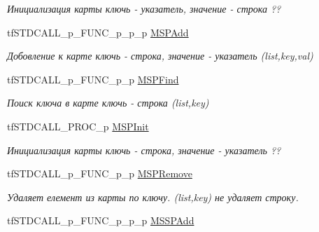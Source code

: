 \begin{DoxyCompactItemize}
\begin{DoxyCompactList}\small\item\em Инициализация карты ключь -\/ указатель, значение -\/ строка ?? \end{DoxyCompactList}\item 
\hypertarget{structs_functions_array_c_p_u_a66be444d39d6671d135d027d992580e2}{tf\-S\-T\-D\-C\-A\-L\-L\-\_\-p\-\_\-\-F\-U\-N\-C\-\_\-p\-\_\-p\-\_\-p \hyperlink{structs_functions_array_c_p_u_a66be444d39d6671d135d027d992580e2}{M\-S\-P\-Add}}\label{structs_functions_array_c_p_u_a66be444d39d6671d135d027d992580e2}

\begin{DoxyCompactList}\small\item\em Добовление к карте ключь -\/ строка, значение -\/ указатель (list,key,val) \end{DoxyCompactList}\item 
\hypertarget{structs_functions_array_c_p_u_adfe368438b4aeb33922bc8b84117992d}{tf\-S\-T\-D\-C\-A\-L\-L\-\_\-p\-\_\-\-F\-U\-N\-C\-\_\-p\-\_\-p \hyperlink{structs_functions_array_c_p_u_adfe368438b4aeb33922bc8b84117992d}{M\-S\-P\-Find}}\label{structs_functions_array_c_p_u_adfe368438b4aeb33922bc8b84117992d}

\begin{DoxyCompactList}\small\item\em Поиск ключа в карте ключь -\/ строка (list,key) \end{DoxyCompactList}\item 
\hypertarget{structs_functions_array_c_p_u_ad133c75c9751004abfc99099c2749949}{tf\-S\-T\-D\-C\-A\-L\-L\-\_\-\-P\-R\-O\-C\-\_\-p \hyperlink{structs_functions_array_c_p_u_ad133c75c9751004abfc99099c2749949}{M\-S\-P\-Init}}\label{structs_functions_array_c_p_u_ad133c75c9751004abfc99099c2749949}

\begin{DoxyCompactList}\small\item\em Инициализация карты ключь -\/ строка, значение -\/ указатель ?? \end{DoxyCompactList}\item 
\hypertarget{structs_functions_array_c_p_u_a47bfc2f7f460ce71b25829b1aa747db9}{tf\-S\-T\-D\-C\-A\-L\-L\-\_\-p\-\_\-\-F\-U\-N\-C\-\_\-p\-\_\-p \hyperlink{structs_functions_array_c_p_u_a47bfc2f7f460ce71b25829b1aa747db9}{M\-S\-P\-Remove}}\label{structs_functions_array_c_p_u_a47bfc2f7f460ce71b25829b1aa747db9}

\begin{DoxyCompactList}\small\item\em Удаляет елемент из карты по ключу. (list,key) не удаляет строку. \end{DoxyCompactList}\item 
\hypertarget{structs_functions_array_c_p_u_a5fdc35b9e96a54335fb7fa424cbf6cc0}{tf\-S\-T\-D\-C\-A\-L\-L\-\_\-p\-\_\-\-F\-U\-N\-C\-\_\-p\-\_\-p\-\_\-p \hyperlink{structs_functions_array_c_p_u_a5fdc35b9e96a54335fb7fa424cbf6cc0}{M\-S\-S\-P\-Add}}\label{structs_functions_array_c_p_u_a5fdc35b9e96a54335fb7fa424cbf6cc0}


\end{DoxyCompactItemize}
